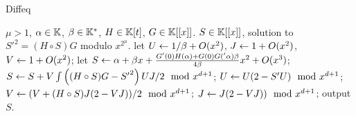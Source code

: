 \begin{algorithm}
  \label{alg:le-si-diff}
  \caption{Diffeq}
  \begin{algorithmic}[1]
    \REQUIRE $\mu>1$, $\alpha\in\mathbb{K}$, $\beta\in\mathbb{K}^\ast$, $H\in\mathbb{K}[t]$, $G\in\mathbb{K}[[x]]$.
    \ENSURE $S\in\mathbb{K}[[x]]$, solution to ${S'}^2=(H\circ S)G$ modulo $x^{2^\mu}$.
    \STATE let $U \leftarrow 1/\beta +O(x^2)$, $J \leftarrow 1 + O(x^2)$, $V \leftarrow 1 + O(x^2)$;
    \STATE let $S \leftarrow \alpha + \beta x +  \frac{G'(0)H(\alpha) + G(0)G('\alpha)\beta}{4\beta}x^2+O(x^3)$;
    \STATE \label{alg:le-si-diff:int}$S \leftarrow S + V\int\left((H\circ S)G - {S'}^2\right)UJ/2 \mod x^{d+1}$;
    \STATE $U \leftarrow U(2 - S' U) \mod x^{d+1}$;
    \STATE $V \leftarrow (V +  (H\circ S) J (2 - VJ))/2 \mod x^{d+1}$;
    \STATE $J \leftarrow J(2-VJ)) \mod x^{d+1}$;
    \ENDFOR
    \STATE output $S$.
  \end{algorithmic}
\end{algorithm}

